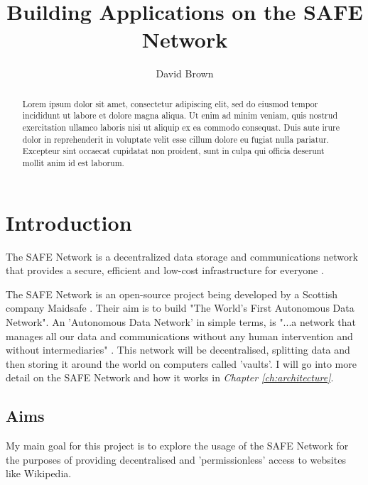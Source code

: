 \documentclass{l4proj}
\begin{document}
\title{Building Applications on the SAFE Network}	
\author{David Brown}
\maketitle

\begin{abstract}
Lorem ipsum dolor sit amet, consectetur adipiscing elit, sed do eiusmod tempor incididunt ut labore et dolore magna aliqua. Ut enim ad minim veniam, quis nostrud exercitation ullamco laboris nisi ut aliquip ex ea commodo consequat. Duis aute irure dolor in reprehenderit in voluptate velit esse cillum dolore eu fugiat nulla pariatur. Excepteur sint occaecat cupidatat non proident, sunt in culpa qui officia deserunt mollit anim id est laborum.
\end{abstract}

\educationalconsent

\tableofcontents

\chapter{Introduction}

\begin{displayquote}
The SAFE Network is a decentralized data storage and communications network that provides a secure, efficient
and low-cost infrastructure for everyone \cite{safenetwork}.
\end{displayquote}

The SAFE Network \cite{safenetwork} is an open-source project being developed by a Scottish company Maidsafe \cite{maidsafe}. Their aim is to build "The World's First Autonomous Data Network". An 'Autonomous Data Network' in simple terms, is "...a network that manages all our data and communications without any human intervention and without intermediaries" \cite{autonomous-data-networks}. This network will be decentralised, splitting data and then storing it around the world on computers called 'vaults'. I will go into more detail on the SAFE Network and how it works in \textit{Chapter \ref{ch:architecture}}.

\section{Aims}

My main goal for this project is to explore the usage of the SAFE Network for the purposes of providing decentralised and 'permissionless' access to websites like Wikipedia.
\end{document}
